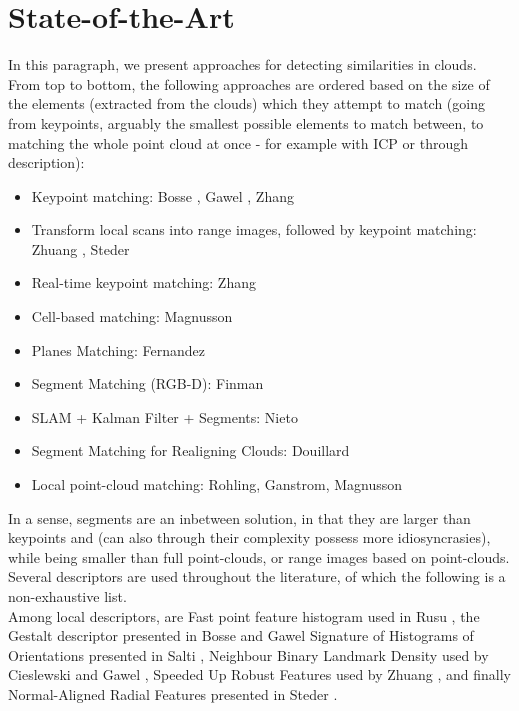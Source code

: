 \section{State-of-the-Art}
\label{sec:SOTA}

In this paragraph, we present approaches for detecting similarities in clouds. From top to bottom, the following approaches are ordered based on the size of the elements (extracted from the clouds) which they attempt to match (going from keypoints, arguably the smallest possible elements to match between, to matching the whole point cloud at once - for example with ICP or through description):

\begin{itemize}
  \item{Keypoint matching: Bosse \cite{bosse2013place}, Gawel \cite{Gawel2016}, Zhang \cite{zhang2014loam}}
\item{Transform local scans into range images, followed by keypoint matching: Zhuang \cite{zhuang20133},  Steder \cite{steder2010robust, steder2011place}}
  \item{Real-time keypoint matching: Zhang \citet{zhang2014loam}}
  \item{Cell-based matching: Magnusson \cite{magnusson2009automatic}}
  \item{Planes Matching: Fernandez \cite{fernandez2013fast, fernandez2016scene}}
  \item{Segment Matching (RGB-D): Finman \cite{finman2015icraws}}
  \item{SLAM + Kalman Filter + Segments: Nieto \cite{nieto2006scan}}
  \item{Segment Matching for Realigning Clouds: Douillard \cite{douillard2012scan, douillard2014pipeline}}
  \item{Local point-cloud matching: Rohling, Ganstrom, Magnusson \cite{rohling2015fast, granstrom2011learning,magnusson2009automatic}}
\end{itemize}

In a sense, segments are an inbetween solution, in that they are larger than keypoints and (can also through their complexity possess more idiosyncrasies), while being smaller than full point-clouds, or range images based on point-clouds.\\


Several descriptors are used throughout the literature, of which the following is a non-exhaustive list.\\

Among local descriptors, are 
Fast point feature histogram used in Rusu \cite{rusu2009fast}, 
the Gestalt descriptor presented in Bosse \cite{bosse2013place} and Gawel \cite{Gawel2016}
Signature of Histograms of Orientations presented in Salti \cite{salti2014shot},
Neighbour Binary Landmark Density used by Cieslewski \cite{cieslewski2016point} and Gawel \cite{Gawel2016},
Speeded Up Robust Features used by Zhuang \cite{zhuang20133}, and finally 
Normal-Aligned Radial Features presented in Steder \cite{steder2011place}.\\

